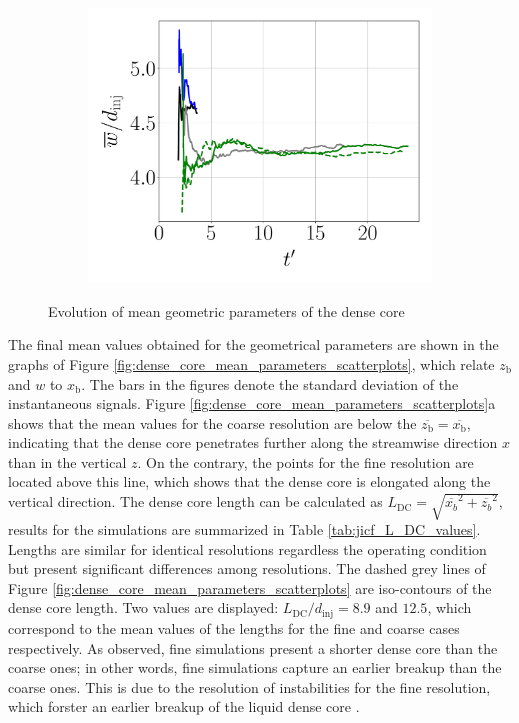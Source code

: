 \begin{figure}[ht]
\hfill
\begin{subfigure}[b]{0.3\textwidth}
	\flushleft
   \includegraphics[scale=0.225]{./part2_developments/figures_ch5_resolved_JICF/results_dense_core_modeling/convergence_mean_width}
\end{subfigure}
   \caption{Evolution of mean geometric parameters of the dense core}
\label{fig:dense_core_mean_parameters_convergence}
\end{figure}

The final mean values obtained for the geometrical parameters are shown in the graphs of Figure \ref{fig:dense_core_mean_parameters_scatterplots}, which relate $z_\mathrm{b}$ and $w$ to $x_\mathrm{b}$. The bars in the figures denote the standard deviation of the instantaneous signals. Figure \ref{fig:dense_core_mean_parameters_scatterplots}a shows that the mean values for the coarse resolution are below the $\overline{z_\mathrm{b}} = \overline{x_\mathrm{b}}$, indicating that the dense core penetrates further along the streamwise direction $x$ than in the vertical $z$. On the contrary, the points for the fine resolution are located above this line, which shows that the dense core is elongated along the vertical direction. The dense core length can be calculated as $L_\mathrm{DC} = \sqrt{\overline{x_b}^2 + \overline{z_b}^2}$, results for the simulations are summarized in Table \ref{tab:jicf_L_DC_values}. Lengths are similar for identical resolutions regardless the operating condition but present significant differences among resolutions. The dashed grey lines of Figure \ref{fig:dense_core_mean_parameters_scatterplots} are iso-contours of the dense core length.  Two values are displayed: $L_\mathrm{DC}/d_\mathrm{inj} = 8.9$ and $12.5$, which correspond to the mean values of the lengths for the fine and coarse cases respectively. As observed, fine simulations present a shorter dense core than the coarse ones; in other words, fine simulations capture an earlier breakup than the coarse ones. This is due to the resolution of instabilities for the fine resolution, which forster an earlier breakup of the liquid dense core .

